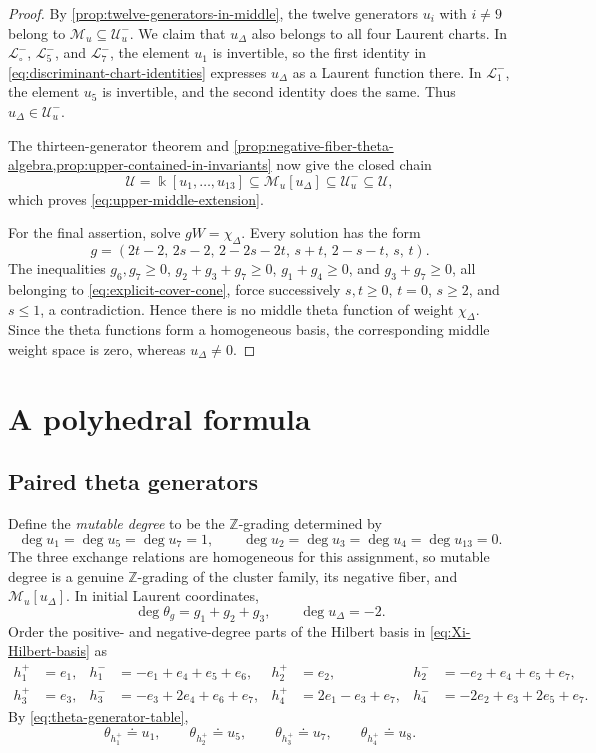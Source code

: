 \documentclass[11pt,reqno]{amsart}
\numberwithin{equation}{section}
\theoremstyle{remark}
\newcommand{\kk}{\Bbbk}
\newcommand{\ZZ}{\mathbb{Z}}
\newcommand{\cL}{\mathcal{L}}
\newcommand{\UR}{\mathscr U}
\newcommand{\Uneg}{\mathcal U_u^{-}}
\newcommand{\Mu}{\mathcal M_u}
\newcommand{\udisc}{u_{\Delta}}
\begin{document}
\begin{proof}
By \cref{prop:twelve-generators-in-middle}, the twelve generators
$u_i$ with $i\ne9$ belong to $\Mu\subseteq\Uneg$.  We claim that
$\udisc$ also belongs to all four Laurent charts.  In
$\cL_\circ^-$, $\cL_5^-$, and $\cL_7^-$, the element $u_1$ is
invertible, so the first identity in
\eqref{eq:discriminant-chart-identities} expresses $\udisc$ as a Laurent
function there.  In $\cL_1^-$, the element $u_5$ is invertible, and the
second identity does the same.  Thus $\udisc\in\Uneg$.

The thirteen-generator theorem and
\cref{prop:negative-fiber-theta-algebra,prop:upper-contained-in-invariants}
now give the closed chain
\[ \UR=\kk[u_1,\ldots,u_{13}] \subseteq\Mu[\udisc] \subseteq\Uneg \subseteq\UR, \]
which proves \eqref{eq:upper-middle-extension}.

For the final assertion, solve $gW=\chi_\Delta$.  Every solution has the form
\[ g=(2t-2,\,2s-2,\,2-2s-2t,\,s+t,\,2-s-t,\,s,\,t). \]
The inequalities $g_6,g_7\ge0$,
$g_2+g_3+g_7\ge0$,
$g_1+g_4\ge0$, and $g_3+g_7\ge0$, all belonging to
\eqref{eq:explicit-cover-cone}, force successively
$s,t\ge0$, $t=0$, $s\ge2$, and $s\le1$, a contradiction.
Hence there is no middle theta function of weight $\chi_\Delta$.  Since the
theta functions form a homogeneous basis, the corresponding middle weight
space is zero, whereas $\udisc\ne0$.
\end{proof}

\section{A polyhedral formula}
\label{sec:polyhedral}

\subsection{Paired theta generators}

Define the \emph{mutable degree} to be the $\ZZ$-grading determined by
\[ \deg u_1=\deg u_5=\deg u_7=1, \qquad \deg u_2=\deg u_3=\deg u_4=\deg u_{13}=0. \]
The three exchange relations are homogeneous for this assignment, so mutable
degree is a genuine $\ZZ$-grading of the cluster family, its negative
fiber, and $\Mu[\udisc]$.  In initial Laurent coordinates,
\[ \deg\theta_g=g_1+g_2+g_3, \qquad \deg\udisc=-2. \]
Order the positive- and negative-degree parts of the
Hilbert basis in \eqref{eq:Xi-Hilbert-basis} as
\[
\begin{aligned}
 h_1^+&=e_1,&
 h_1^-&=-e_1+e_4+e_5+e_6,&
 h_2^+&=e_2,&
 h_2^-&=-e_2+e_4+e_5+e_7,\\ 
 h_3^+&=e_3,&
 h_3^-&=-e_3+2e_4+e_6+e_7,&
 h_4^+&=2e_1-e_3+e_7,&
 h_4^-&=-2e_2+e_3+2e_5+e_7.
\end{aligned}
\]
By \eqref{eq:theta-generator-table},
\[ \theta_{h_1^+}\doteq u_1,\qquad \theta_{h_2^+}\doteq u_5,\qquad \theta_{h_3^+}\doteq u_7,\qquad \theta_{h_4^+}\doteq u_8. \]
\end{document}
